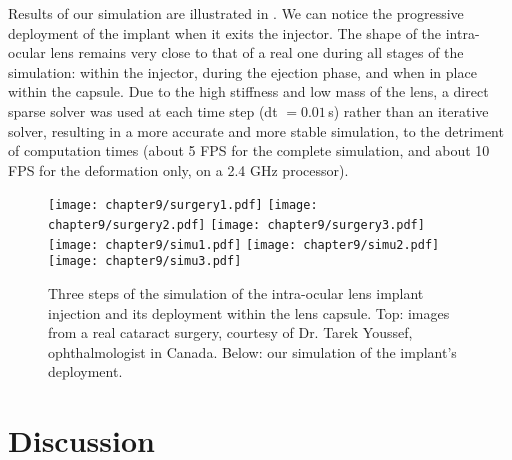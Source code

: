 Results of our simulation are illustrated in . We can notice the progressive deployment of the implant when it exits the injector.  The shape of the intra-ocular lens remains very close to that of a real one during all stages of the simulation: within the injector, during the ejection phase, and when in place within the capsule. Due to the high stiffness and low mass of the lens, a direct sparse solver was used at each time step (dt $= 0.01\,$s) rather than an iterative solver, resulting in a more accurate and more stable simulation, to the detriment of computation times (about 5 FPS for the complete simulation, and about 10 FPS for the deformation only, on a 2.4 GHz processor).

\begin{figure}[ht]
\centering
\texttt{[image: chapter9/surgery1.pdf]}
\hfill
\texttt{[image: chapter9/surgery2.pdf]}
\hfill
\texttt{[image: chapter9/surgery3.pdf]} \\
\vspace{0.1cm}
\texttt{[image: chapter9/simu1.pdf]}
\hfill
\texttt{[image: chapter9/simu2.pdf]}
\hfill
\texttt{[image: chapter9/simu3.pdf]}
\caption [Lens imlant] {Three steps of the simulation of the intra-ocular lens implant injection and its deployment within the lens capsule. Top: images from a real cataract surgery, courtesy of Dr. Tarek Youssef, ophthalmologist in Canada. Below: our simulation of the implant's deployment.}
\label{chap9:fig-simu-results}
\end{figure}


\section{Discussion}

